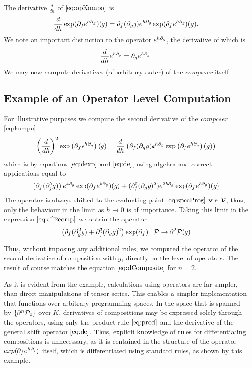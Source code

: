 The derivative $\frac{d}{dh}$ of $\eqref{eq:opKompo}$ is 
 \begin{equation}\label{eq:dexp}
 \frac{d}{dh}\exp(\partial_fe^{h\partial_g})(g)=\partial_f(\partial_gg)e^{h\partial_g}\exp(\partial_fe^{h\partial_g})(g).
 \end{equation} 
 We note an important distinction to the operator $e^{h\partial_g}$, the derivative of which is
 \begin{equation}\label{eq:de}
\frac{d}{dh}e^{h\partial_g}=\partial_ge^{h\partial_g}.
 \end{equation}
 We may now compute derivatives (of arbitrary order) of the \emph{composer} itself.

\subsection{Example of an Operator Level Computation}\label{sec:example}

 For illustrative purposes we compute the second derivative of the \emph{composer} \eqref{eq:kompo}
 $$\left(\frac{d}{dh}\right)^2\exp\left(\partial_fe^{h\partial_g}\right)(g)=\frac{d}{dh}\left(\partial_f(\partial_gg)e^{h\partial_g}\exp\left(\partial_fe^{h\partial_g}\right)(g)\right)$$
 which is by equations $\eqref{eq:dexp}$ and $\eqref{eq:de}$, using algebra and correct applications equal to
 \begin{equation}\label{eq:d^2comp}
 \left(\partial_f(\partial^2_gg)\right)e^{h\partial_g}\exp(\partial_fe^{h\partial_g})(g)+(\partial^2_f(\partial_gg)^2)e^{2h\partial_g}\exp(\partial_fe^{h\partial_g})(g)
 \end{equation}
 The operator is always shifted to the evaluating point $\eqref{eq:specProg}$ $\mathbf{v}\in \mathcal{V}$, thus, only the behaviour in the limit as $h\to 0$ is of importance. Taking this limit in the expression $\eqref{eq:d^2comp}$ we obtain the operator
 \begin{equation*}
  \left(\partial_f(\partial^2_gg)+\partial^2_f(\partial_gg)^2\right)\exp(\partial_f):\mathcal{P}\to\partial^2\mathcal{P}(g)
 \end{equation*}
 
 Thus, without imposing any additional rules, we computed the operator of the second derivative of composition with $g$, directly on the level of operators. The result of course matches the equation $\eqref{eq:dComposite}$ for $n=2$.
 
 As it is evident from the example, calculations using operators are far
 simpler, than direct manipulations of tensor series. This enables a simpler
 implementation that functions over arbitrary programming spaces. In
 the space that is spanned by $\{\partial^n\mathcal{P}_0\}$ over $K$, derivatives of
 compositions may be expressed solely through the operators, using only the
 product rule $\eqref{eq:prod}$ and the derivative of the general shift operator
 $\eqref{eq:de}$. Thus, explicit knowledge of rules for differentiating
 compositions is unnecessary, as it is contained in the structure of the
 operator $exp(\partial_fe^{h\partial_g})$ itself, which is differentiated using standard
 rules, as shown by this example. 

